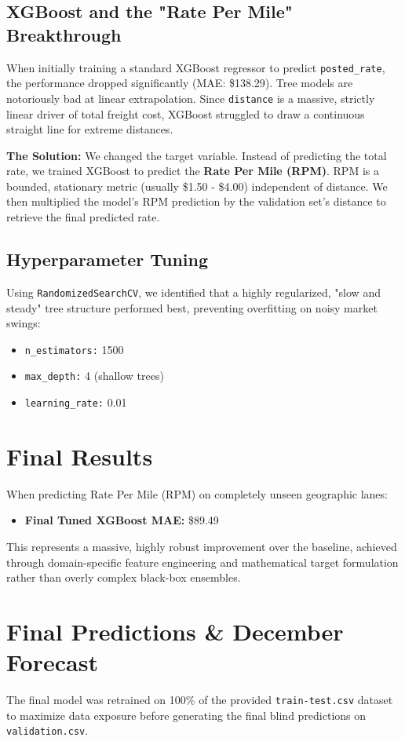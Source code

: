 \documentclass{article}
\begin{document}
\subsection{XGBoost and the "Rate Per Mile" Breakthrough}
When initially training a standard XGBoost regressor to predict \texttt{posted\_rate}, the performance dropped significantly (MAE: \$138.29). 
Tree models are notoriously bad at linear extrapolation. Since \texttt{distance} is a massive, strictly linear driver of total freight cost, XGBoost struggled to draw a continuous straight line for extreme distances.

\textbf{The Solution:} We changed the target variable. Instead of predicting the total rate, we trained XGBoost to predict the \textbf{Rate Per Mile (RPM)}. RPM is a bounded, stationary metric (usually \$1.50 - \$4.00) independent of distance. We then multiplied the model's RPM prediction by the validation set's distance to retrieve the final predicted rate.

\subsection{Hyperparameter Tuning}
Using \texttt{RandomizedSearchCV}, we identified that a highly regularized, "slow and steady" tree structure performed best, preventing overfitting on noisy market swings:
\begin{itemize}
    \item \texttt{n\_estimators:} 1500
    \item \texttt{max\_depth:} 4 (shallow trees)
    \item \texttt{learning\_rate:} 0.01
\end{itemize}

\section{Final Results}
When predicting Rate Per Mile (RPM) on completely unseen geographic lanes:
\begin{itemize}
    \item \textbf{Final Tuned XGBoost MAE:} \$89.49
\end{itemize}

This represents a massive, highly robust improvement over the baseline, achieved through domain-specific feature engineering and mathematical target formulation rather than overly complex black-box ensembles.

\section{Final Predictions \& December Forecast}
The final model was retrained on 100\% of the provided \texttt{train-test.csv} dataset to maximize data exposure before generating the final blind predictions on \texttt{validation.csv}.
\end{document}

